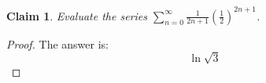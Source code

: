 \documentclass{article}
\newtheorem{theorem}{Claim}
\begin{document}
\begin{theorem}
Evaluate the series $\sum\limits_{n=0}^\infty \frac{1}{2n+1}\left(\frac12\right)^{2n+1}$.
\end{theorem}

\begin{proof}
The answer is:
\[
\ln\sqrt{3}
\]
\end{proof}
\end{document}
